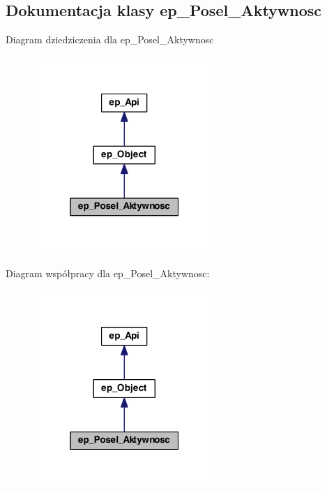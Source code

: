 \hypertarget{classep___posel___aktywnosc}{\subsection{Dokumentacja klasy ep\-\_\-\-Posel\-\_\-\-Aktywnosc}
\label{classep___posel___aktywnosc}
}


Diagram dziedziczenia dla ep\-\_\-\-Posel\-\_\-\-Aktywnosc\nopagebreak
\begin{figure}[H]
\begin{center}
\leavevmode
\includegraphics[width=196pt]{classep___posel___aktywnosc__inherit__graph}
\end{center}
\end{figure}


Diagram współpracy dla ep\-\_\-\-Posel\-\_\-\-Aktywnosc\-:\nopagebreak
\begin{figure}[H]
\begin{center}
\leavevmode
\includegraphics[width=196pt]{classep___posel___aktywnosc__coll__graph}
\end{center}
\end{figure}
